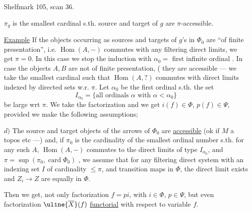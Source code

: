 Shelfmark 105, scan 36.

$\pi_g$ is the smallest cardinal s.th. source and target of $g$ are $\pi$-accessible.

\uline{Example} If the objects occurring as sources and targets of $g$'s in $\Phi_0$ are ``of finite presentation'', i.e. $\operatorname{Hom}(A,-)$ commutes with any filtering direct limits, we get $\pi=0$. In this case we stop the induction with $\alpha_0=$ first infinite ordinal . In case the objects $A,B$ are not of finite presentation, ( they are accessible
--- we take the smallest cardinal such that $\operatorname{Hom}(A,?)$ commutes with direct limits indexed by  directed sets   w.r. $\pi$.
Let  $\alpha_0$ be the first ordinal s.th. the set
\[
I_{\alpha_0}=\{\text{all ordinals }\alpha\text{ with }\alpha<\alpha_0\}
\]
be  large wrt $\pi$. We take the factorization
and we get $i(f)\in\Phi$, $p(f)\in\Psi$, provided we make the following assumptions;

$d)$ The  source and target objects of the arrows of $\Phi_0$ are \uline{accessible}
(ok if $M$ a topos etc ---) and, if $\pi_0$ is the cardinality of the smallest ordinal number  s.th. for any such $A$, $\operatorname{Hom}(A,-)$ commutes to the direct limits of type $I_{\alpha_0}$,  and \deleted{$\pi=\sup(\unsure{\pi}$}
$\pi=\sup(\pi_0,\operatorname{card}\Phi_0)$ , we assume that for any filtering direct system with an indexing set $I$ of cardinality $\leq\pi$, and transition maps in $\Phi$, the direct limit exists and  $Z_i\to Z$ are equally in $\Phi$.

Then we get, not only factorization $f=pi$, with $i\in\Phi$, $p\in\Psi$, but even factorization $\uline{\overline X}(f)$ \uline{functorial} with respect to variable $f$.

